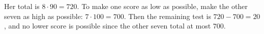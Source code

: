 Her total is $8\cdot90=720$. To make one score as low as possible, make the other seven as high as possible: $7\cdot 100=700$. Then the remaining test is $720-700=\boxed{20}$, and no lower score is possible since the other seven total at most $700$.
